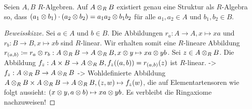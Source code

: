 \documentclass[../main.tex]{subfiles}
\begin{document}
\begin{theorem}
    Seien $A,B$ $R$-Algebren.
    Auf $A\otimes_R B$ existiert genau eine Struktur als $R$-Algebra so, dass $(a_1\otimes b_1)\cdot (a_2 \otimes b_2) = a_1a_2 \otimes b_1b_2$ für alle $a_1,a_2\in A$ und $b_1,b_2\in B$.
\end{theorem}
\begin{proof}[Beweisskizze]
    Sei $a\in A$ und $b\in B$.
    Die Abbildungen $r_a:A\rightarrow A, x\mapsto xa$ und $r_b:B\rightarrow B, x\mapsto xb$ sind $R$-linear.
    Wir erhalten somit eine $R$-lineare Abbildung $r_{(a,b)} \coloneqq r_a\otimes r_b: A\otimes_R B \rightarrow A\otimes_R B, x\otimes y\mapsto xa\otimes yb$.
    Sei $z\in A\otimes_R B$. Die Abbildung $f_z: A\times B \rightarrow A\otimes_R B, f_z((a,b)) = r_{(a,b)}(z)$ ist $R$-linear.
    -> $f_z:A\otimes_R B\rightarrow A\otimes_R B$ 
    -> Wohldefinierte Abbildung $A\otimes_R B \times A\otimes_R B \rightarrow A\otimes_R B, (z,w) \mapsto f_z(w)$, die auf Elementartensoren wie folgt aussieht:
    $(x\otimes y, a\otimes b)\mapsto xa\otimes yb$.
    Es verbleibt die Ringaxiome nachzuweisen!
\end{proof}
\end{document}
